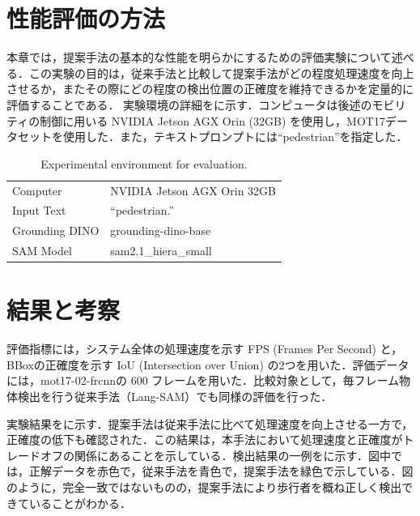 
\section{性能評価の方法}
本章では，提案手法の基本的な性能を明らかにするための評価実験について述べる．この実験の目的は，従来手法と比較して提案手法がどの程度処理速度を向上させるか，またその際にどの程度の検出位置の正確度を維持できるかを定量的に評価することである．
実験環境の詳細をに示す．コンピュータは後述のモビリティの制御に用いる NVIDIA Jetson AGX Orin (32GB) を使用し，MOT17データセット\cite{mot16}を使用した．また，テキストプロンプトには“pedestrian”を指定した．

\vspace{1cm}

\begin{table}[htbp]
\centering
\caption{Experimental environment for evaluation.}
\label{tab:env_evaluation}
\begin{tabular}{ll}
\hline
Computer & NVIDIA Jetson AGX Orin 32GB \\
Input Text & ``pedestrian.'' \\
Grounding DINO & grounding-dino-base \\
SAM Model & sam2.1\_hiera\_small \\
\hline
\end{tabular}
\end{table}

\newpage

\section{結果と考察}
評価指標には，システム全体の処理速度を示す FPS (Frames Per Second) と，BBoxの正確度を示す IoU (Intersection over Union) の2つを用いた．評価データには，mot17-02-frcnnの 600 フレームを用いた．比較対象として，毎フレーム物体検出を行う従来手法（Lang-SAM）でも同様の評価を行った．

実験結果をに示す．提案手法は従来手法に比べて処理速度を向上させる一方で，正確度の低下も確認された．この結果は，本手法において処理速度と正確度がトレードオフの関係にあることを示している．検出結果の一例をに示す．図中では，正解データを赤色で，従来手法を青色で，提案手法を緑色で示している．図のように，完全一致ではないものの，提案手法により歩行者を概ね正しく検出できていることがわかる．

\vspace{1cm}

